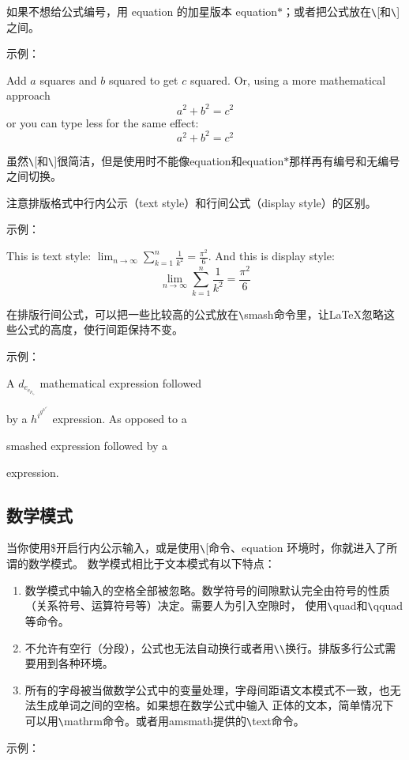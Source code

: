 \documentclass[UTF8]{ctexart}
\begin{document}
如果不想给公式编号，用 equation 的加星版本 equation$*$；或者把公式放在\texttt{\textbackslash}[和\texttt{\textbackslash}]之间。

示例：

Add $a$ squares and $b$ squared to get
$c$ squared. Or, using a more mathematical approach
\begin{equation*}
  a^2 + b^2 = c^2
\end{equation*}
\qquad or you can type less for the same effect:
\[ a^2 + b^2 = c^2 \]

虽然\texttt{\textbackslash}[和\texttt{\textbackslash}]很简洁，但是使用时不能像equation和equation$*$那样再有编号和无编号之间切换。

注意排版格式中行内公示（text style）和行间公式（display style）的区别。

示例：

This is text style:
$\lim_{n \to \infty}
 \sum_{k=1}^n \frac{1}{k^2}
= \frac{\pi^2}{6}$.
And this is display style:
 \begin{equation}
   \lim_{n \to \infty}
   \sum_{k=1}^n \frac{1}{k^2}
   = \frac{\pi^2}{6}
\end{equation}

在排版行间公式，可以把一些比较高的公式放在\texttt{\textbackslash}smash命令里，让\LaTeX 忽略这些公式的高度，使行间距保持不变。

示例：

A $d_{e_{e_{p_{e_r}}}}$ mathematical expression followed

by a $h^{i^{g^{h^{e^r}}}}$ expression. As opposed to a

smashed  expression followed by a

 expression.
\subsection{数学模式}
当你使用\$开启行内公示输入，或是使用\texttt{\textbackslash}[命令、equation 环境时，你就进入了所谓的数学模式。
数学模式相比于文本模式有以下特点：
\begin{enumerate}
\item 数学模式中输入的空格全部被忽略。数学符号的间隙默认完全由符号的性质（关系符号、运算符号等）决定。需要人为引入空隙时，
使用\texttt{\textbackslash}quad和\texttt{\textbackslash}qquad等命令。
\item 不允许有空行（分段），公式也无法自动换行或者用\texttt{\textbackslash}\texttt{\textbackslash}换行。排版多行公式需要用到各种环境。
\item 所有的字母被当做数学公式中的变量处理，字母间距语文本模式不一致，也无法生成单词之间的空格。如果想在数学公式中输入
正体的文本，简单情况下可以用\texttt{\textbackslash}mathrm命令。或者用amsmath提供的\texttt{\textbackslash}text命令。
\end{enumerate}
示例：
\end{document}
